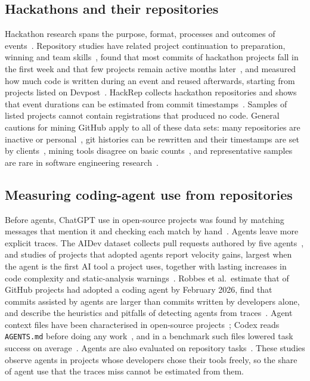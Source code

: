\documentclass{article}
\begin{document}
\subsection{Hackathons and their repositories}
Hackathon research spans the purpose, format, processes and outcomes of events~\cite{chau2023hackathons}. Repository studies have related project continuation to preparation, winning and team skills~\cite{nolte2020hackathon}, found that most commits of hackathon projects fall in the first week and that few projects remain active months later~\cite{mcintosh2021hackathon}, and measured how much code is written during an event and reused afterwards, starting from \devpostprojects{} projects listed on Devpost~\cite{imam2021secretlife,mahmoud2022oneoff}. HackRep collects \hackrepsize{} hackathon repositories and shows that event durations can be estimated from commit timestamps~\cite{halmans2026hackrep}. Samples of listed projects cannot contain registrations that produced no code. General cautions for mining GitHub apply to all of these data sets: many repositories are inactive or personal~\cite{kalliamvakou2014perils}, git histories can be rewritten and their timestamps are set by clients~\cite{bird2009git}, mining tools disagree on basic counts~\cite{hoess2025toolmatter}, and representative samples are rare in software engineering research~\cite{baltes2022sampling}.

\subsection{Measuring coding-agent use from repositories}
Before agents, ChatGPT use in open-source projects was found by matching messages that mention it and checking each match by hand~\cite{tufano2024chatgpt}. Agents leave more explicit traces. The AIDev dataset collects pull requests authored by five agents~\cite{li2025aidev}, and studies of projects that adopted agents report velocity gains, largest when the agent is the first AI tool a project uses, together with lasting increases in code complexity and static-analysis warnings~\cite{agarwal2026aiides,he2026cursor}. Robbes et al.\ estimate that \robbesrate{} of \robbesprojects{} GitHub projects had adopted a coding agent by February 2026, find that commits assisted by agents are larger than commits written by developers alone, and describe the heuristics and pitfalls of detecting agents from traces~\cite{robbes2026agenticmuch,robbes2026heuristics}. Agent context files have been characterised in open-source projects~\cite{chatlatanagulchai2025agentreadmes}; Codex reads \texttt{AGENTS.md} before doing any work~\cite{openai2026agentsmd}, and in a benchmark such files lowered task success on average~\cite{gloaguen2026agentsmd}. Agents are also evaluated on repository tasks~\cite{jimenez2023swebench,yang2024sweagent}. These studies observe agents in projects whose developers chose their tools freely, so the share of agent use that the traces miss cannot be estimated from them.
\end{document}
